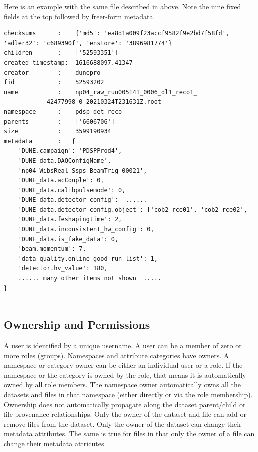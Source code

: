 \documentclass[../main-v1.tex]{subfiles}
\begin{document}
Here is an example with the same file described in  above. Note the nine fixed fields at the top followed by freer-form metadata. 

\begin{verbatim}
checksums      :    {'md5': 'ea8d1a009f23accf9582f9e2bd7f58fd', 'adler32': 'c689390f', 'enstore': '3896981774'}
children       :    ['52593351']
created_timestamp:  1616688097.41347
creator        :    dunepro
fid            :    52593202
name           :    np04_raw_run005141_0006_dl1_reco1_
            42477998_0_20210324T231631Z.root
namespace      :    pdsp_det_reco
parents        :    ['6606706']
size           :    3599190934
metadata       :   {
    'DUNE.campaign': 'PDSPProd4',
    'DUNE_data.DAQConfigName',
    'np04_WibsReal_Ssps_BeamTrig_00021',
    'DUNE_data.acCouple': 0,
    'DUNE_data.calibpulsemode': 0,
    'DUNE_data.detector_config':  ...... 
    'DUNE_data.detector_config.object': ['cob2_rce01', 'cob2_rce02',
    'DUNE_data.feshapingtime': 2,
    'DUNE_data.inconsistent_hw_config': 0,
    'DUNE_data.is_fake_data': 0,
    'beam.momentum': 7,
    'data_quality.online_good_run_list': 1,
    'detector.hv_value': 180,
    ...... many other items not shown  .....
}


 \end{verbatim}

\subsection{Ownership and Permissions }

A  user  is identified  by a unique username. A user can be a member of zero or more roles (groups). Namespaces and attribute categories have owners. A namespace or category owner can be either an individual user or a role. If the namespace or the category is owned by the role, %
that means it is automatically owned by all role members. 
The namespace owner automatically owns all the datasets and files in that namespace (either directly or via the role membership). Ownership does not automatically propagate along the dataset parent/child or file provenance relationships. 
Only the owner of the dataset and file %
can add or remove files from the dataset. Only the owner of the dataset can change their metadata attributes. The same is true for files in that only the owner of a file can change their metadata attricutes. %
\end{document}
